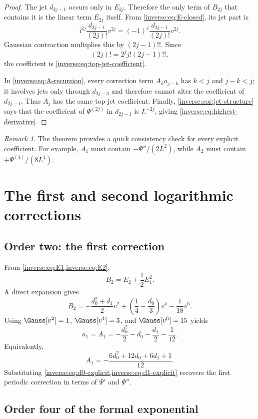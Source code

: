 \documentclass[11pt,oneside]{article}
\theoremstyle{definition}
\theoremstyle{remark}
\newtheorem{remark}[remark]{Remark}
\newcommand{\ii}{\mathrm i}
\begin{document}
\begin{proof}
The jet $d_{2j-1}$ occurs only in $E_{2j}$.  Therefore the only term of
$B_{2j}$ that contains it is the linear term $E_{2j}$ itself.  From
\eqref{inverse:eq:E-closed}, its jet part is
\[
 \ii^{2j}\frac{d_{2j-1}}{(2j)!}v^{2j}
 =(-1)^j\frac{d_{2j-1}}{(2j)!}v^{2j}.
\]
Gaussian contraction multiplies this by $(2j-1)!!$.  Since
\[
 (2j)!=2^jj!(2j-1)!!,
\]
the coefficient is \eqref{inverse:eq:top-jet-coefficient}.

In \eqref{inverse:eq:A-recursion}, every correction term
$A_ka_{j-k}$ has $k<j$ and $j-k<j$; it involves jets only through
$d_{2j-3}$ and therefore cannot alter the coefficient of $d_{2j-1}$.
Thus $A_j$ has the same top-jet coefficient.  Finally,
\cref{inverse:cor:jet-structure} says that the coefficient of
$\Psi^{(2j)}$ in $d_{2j-1}$ is $L^{-2j}$, giving
\eqref{inverse:eq:highest-derivative}.
\end{proof}

\begin{remark}
The theorem provides a quick consistency check for every explicit
coefficient.  For example, $A_1$ must contain
$-\Psi''/(2L^2)$, while $A_2$ must contain
$+\Psi^{(4)}/(8L^4)$.
\end{remark}

\section{The first and second logarithmic corrections}
\label{inverse:sec:second-correction}

\subsection{Order two: the first correction}

From \cref{inverse:eq:E1,inverse:eq:E2},
\[
 B_2=E_2+\frac12E_1^2.
\]
A direct expansion gives
\[
 B_2
 =-\frac{d_0^2+d_1}{2}v^2
   +\left(\frac14-\frac{d_0}{3}\right)v^4
   -\frac1{18}v^6.
\]
Using $\Gauss[v^2]=1$, $\Gauss[v^4]=3$, and
$\Gauss[v^6]=15$ yields
\begin{equation}
 a_1=A_1
 =-\frac{d_0^2}{2}-d_0-\frac{d_1}{2}-\frac1{12}.
 \label{inverse:eq:A1-jets}
\end{equation}
Equivalently,
\[
 A_1=-\frac{6d_0^2+12d_0+6d_1+1}{12}.
\]
Substituting \cref{inverse:eq:d0-explicit,inverse:eq:d1-explicit} recovers the first
periodic correction in terms of $\Psi'$ and $\Psi''$.

\subsection{Order four of the formal exponential}
\end{document}
